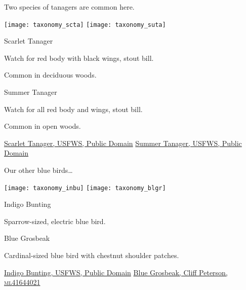 \documentclass[t]{beamer}
\newcommand{\backoneline}{\vspace{-\baselineskip}}
\begin{document}
\begin{frame}{Two species of tanagers are common here.}
	
		\texttt{[image: taxonomy\_scta]}\hfill
		\texttt{[image: taxonomy\_suta]}
	
		\backoneline
		
		\begin{multicols}{2}
				Scarlet Tanager
				
				\medskip
				
				Watch for red body with black wings, stout bill.
				
				\smallskip
				
				Common in deciduous woods.
				
				
				\columnbreak
				
				Summer Tanager
				
				\medskip
				
				Watch for all red body and wings, stout bill.
				
				\smallskip
				
				Common in open woods.
				
			\end{multicols}	
		
		\vfilll
		
		\tiny
		
		\href{https://flickr.com/photos/usfwsnortheast/50109221467}{Scarlet Tanager, USFWS, Public Domain} \hfill 
		\href{https://flickr.com/photos/usfwsnortheast/51177620670}{Summer Tanager, USFWS, Public Domain}
	
\end{frame}

%

\begin{frame}{Our other blue birds\dots}
	
	\texttt{[image: taxonomy\_inbu]}\hfill
	\texttt{[image: taxonomy\_blgr]}
	
	\backoneline
	
	\begin{multicols}{2}
		Indigo Bunting
		
		\medskip
		
		Sparrow-sized, electric blue bird.\newline
		
		
		\columnbreak
		
		Blue Grosbeak
		
		\medskip
		
		Cardinal-sized blue bird with chestnut shoulder patches.
				
	\end{multicols}	
	
	\vfilll
	
	\tiny
	
	\href{https://www.flickr.com/photos/43322816@N08/51385513517}{Indigo Bunting, USFWS, Public Domain}  \hfill 
	\href{https://macaulaylibrary.org/asset/41644021}{Blue Grosbeak, Cliff Peterson, \textsc{ml}41644021}
	
\end{frame}
\end{document}
